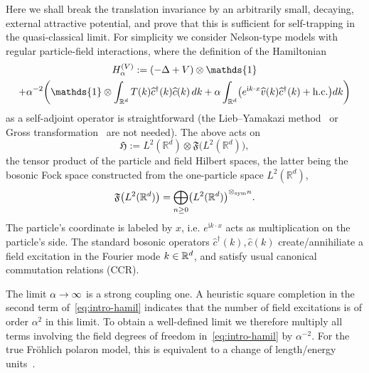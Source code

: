 \documentclass[10pt]{amsart}
\theoremstyle{definition}\newtheorem{defi}[theo]{Definition}\newtheorem{rema}[theo]{Remark}\newtheorem{exam}[theo]{Example}\newtheorem{exem}[theo]{Example}\newtheorem{nota}[theo]{Notation}
\DeclareMathOperator{\symm}{sym}
\newcommand{\im}{\mathrm{i}}
\newcommand{\R}{\mathbb{R}}
\newcommand{\gH}{\mathfrak{H}}
\newcommand{\gF}{\mathfrak{F}}
\newcommand{\1}{\mathds{1}}
\let\oldin\in
\renewcommand{\in}{\mathchoice{\oldin}{\oldin}{\,\oldin\,}{\,\oldin\,}}
\renewcommand*{\to}{\mathchoice{\longrightarrow}{\rightarrow}{\rightarrow}{\rightarrow}}
\let\originalleft\left
\let\originalright\right
\renewcommand{\left}{\mathopen{}\mathclose\bgroup\originalleft}
\renewcommand{\right}{\aftergroup\egroup\originalright}
\begin{document}
Here we shall break the translation invariance by an arbitrarily small, decaying, external attractive potential, and prove that this is sufficient for self-trapping in the quasi-classical limit. For simplicity we consider Nelson-type models with regular particle-field interactions, where the definition of the Hamiltonian
\begin{multline}\label{eq:intro-hamil}
H_\alpha ^{(V)} := \left(-\Delta + V\right) \otimes \1 \\
+ \alpha^{-2}\left(\1 \otimes \int_{\R^d} T(k) \widehat{c}^\dagger (k) \widehat{c} (k)\,dk + \alpha \int_{\R^d} \left(e^{\im k\cdot x} \widehat{v} (k) \widehat{c}^{\dagger} (k) + \text{h.c.} \right)dk \right)
\end{multline}
as a self-adjoint operator is straightforward (the Lieb--Yamakazi method~\cite{LieYam-58} or Gross transformation~\cite{Seiringer-19} are not needed). The above acts on
\begin{equation}\label{eq:intro-hilbert}
\gH := L^2 (\R^d) \otimes \gF \bigl(L^2 (\R^d)\bigr),
\end{equation}
the tensor product of the particle and field Hilbert spaces, the latter being the bosonic Fock space constructed from the one-particle space $L^2 (\R^d)$,
\begin{equation*}
\gF \left(L^2 (\R^d)\right) = \bigoplus_{n\geq 0} \left(L^2 (\R^d)\right)^{\otimes_{\symm} n}.
\end{equation*}
The particle's coordinate is labeled by $x$, i.e. $e^{\im k\cdot x}$ acts as multiplication on the particle's side. The standard bosonic operators $\widehat{c}^\dagger (k),\widehat{c}(k)$ create/annihiliate a field excitation in the Fourier mode $k\in\R^d$, and satisfy usual canonical commutation relations (CCR).

The limit $\alpha \to \infty$ is a strong coupling one. A heuristic square completion in the second term of~\eqref{eq:intro-hamil} indicates that the number of field excitations is of order $\alpha^2$ in this limit. To obtain a well-defined limit we therefore multiply all terms involving the field degrees of freedom in~\eqref{eq:intro-hamil} by $\alpha^{-2}$. For the true Fr\"ohlich polaron model, this is equivalent to a change of length/energy units~\cite{Seiringer-19}.
\end{document}
